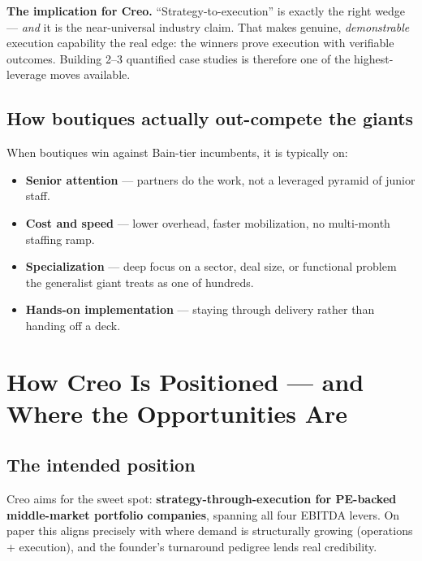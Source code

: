 \documentclass[11pt]{article}
\begin{document}
\begin{takeaway}
\textbf{The implication for Creo.} ``Strategy-to-execution'' is exactly the right
wedge --- \emph{and} it is the near-universal industry claim. That makes
genuine, \emph{demonstrable} execution capability the real edge: the winners
prove execution with verifiable outcomes. Building 2--3 quantified case studies
is therefore one of the highest-leverage moves available.
\end{takeaway}

\subsection{How boutiques actually out-compete the giants}
When boutiques win against Bain-tier incumbents, it is typically on:
\begin{itemize}
  \item \textbf{Senior attention} --- partners do the work, not a leveraged
  pyramid of junior staff.
  \item \textbf{Cost and speed} --- lower overhead, faster mobilization, no
  multi-month staffing ramp.
  \item \textbf{Specialization} --- deep focus on a sector, deal size, or
  functional problem the generalist giant treats as one of hundreds.
  \item \textbf{Hands-on implementation} --- staying through delivery rather
  than handing off a deck.
\end{itemize}

\section{How Creo Is Positioned --- and Where the Opportunities Are}

\subsection{The intended position}
Creo aims for the sweet spot: \textbf{strategy-through-execution for PE-backed
middle-market portfolio companies}, spanning all four EBITDA levers. On paper
this aligns precisely with where demand is structurally growing (operations +
execution), and the founder's turnaround pedigree lends real credibility.
\end{document}
